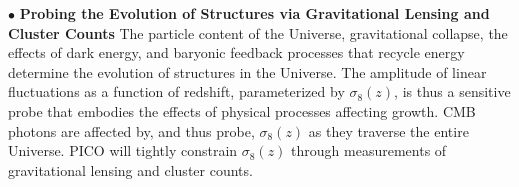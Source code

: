 \documentclass[PICOAPC.tex]{subfiles}
\begin{document}



$\bullet$ {\bf Probing the Evolution of Structures via Gravitational Lensing and Cluster Counts} \hspace{0.1in} \label{sec:gravitationallensing}  The particle content of the Universe, gravitational collapse, the effects of dark energy, and baryonic feedback processes that recycle energy determine the evolution of structures in the Universe. The amplitude of linear fluctuations as a function of redshift, parameterized by $\sigma_8(z)$, is thus a sensitive probe that embodies the effects of physical processes affecting growth. \ac{CMB} photons are affected by, and thus probe, $\sigma_{8}(z)$ as they traverse the entire Universe. PICO will tightly constrain $\sigma_8(z)$ through measurements of gravitational lensing and cluster counts. 
\end{document}
